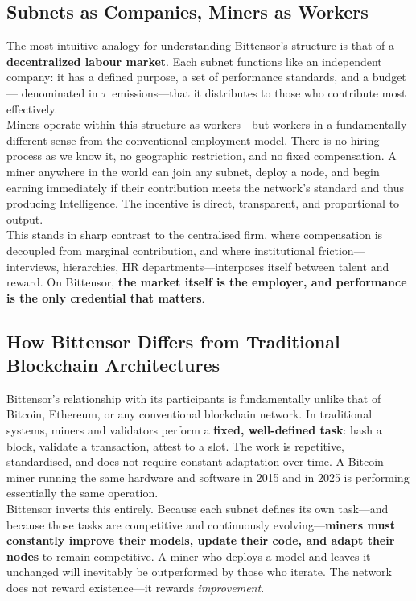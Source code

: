 \documentclass[12pt, a4paper, oneside]{report}
\newcommand{\TAO}{$\tau$}            %
\theoremstyle{definition}
\begin{document}
\subsection{Subnets as Companies, Miners as Workers}

The most intuitive analogy for understanding Bittensor's structure is that of a 
\textbf{decentralized labour market}. Each subnet functions like an independent 
company: it has a defined purpose, a set of performance standards, and a budget—
denominated in \TAO\ emissions—that it distributes to those who contribute most 
effectively.\\[0.4cm]

Miners operate within this structure as workers—but workers in a fundamentally 
different sense from the conventional employment model. There is no hiring process as we know it, 
no geographic restriction, and no fixed compensation. A miner anywhere in the world 
can join any subnet, deploy a node, and begin earning immediately if their 
contribution meets the network's standard and thus producing Intelligence. The incentive is direct, transparent, 
and proportional to output.\\[0.4cm]

This stands in sharp contrast to the centralised firm, where compensation is 
decoupled from marginal contribution, and where institutional friction—interviews, 
hierarchies, HR departments—interposes itself between talent and reward. On 
Bittensor, \textbf{the market itself is the employer, and performance is the 
only credential that matters}.

\subsection{How Bittensor Differs from Traditional Blockchain Architectures}

Bittensor's relationship with its participants is fundamentally unlike that of 
Bitcoin, Ethereum, or any conventional blockchain network. In traditional systems, 
miners and validators perform a \textbf{fixed, well-defined task}: hash a block, 
validate a transaction, attest to a slot. The work is repetitive, standardised, 
and does not require constant adaptation over time. A Bitcoin miner running the same 
hardware and software in 2015 and in 2025 is performing essentially the same 
operation.\\[0.4cm]

Bittensor inverts this entirely. Because each subnet defines its own task—and 
because those tasks are competitive and continuously evolving—\textbf{miners must 
constantly improve their models, update their code, and adapt their nodes} to remain 
competitive. A miner who deploys a model and leaves it unchanged will inevitably be 
outperformed by those who iterate. The network does not reward existence—it rewards 
\emph{improvement}.\\[0.4cm]
\end{document}
